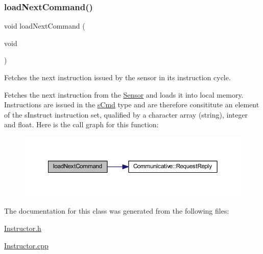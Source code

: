 \subsubsection{\texorpdfstring{loadNextCommand()}{loadNextCommand()}}
{\footnotesize\ttfamily void load\+Next\+Command (\begin{DoxyParamCaption}\item[{void}]{ }\end{DoxyParamCaption})}



Fetches the next instruction issued by the sensor in its instruction cycle. 

Fetches the next instruction from the \mbox{\hyperlink{class_sensor}{Sensor}} and loads it into local memory. Instructions are issued in the \mbox{\hyperlink{structs_cmd}{s\+Cmd}} type and are therefore consititute an element of the s\+Instruct instruction set, qualified by a character array (string), integer and float. Here is the call graph for this function\+:
\nopagebreak
\begin{figure}[H]
\begin{center}
\leavevmode
\includegraphics[width=350pt]{class_instructor_a43cbe18547a30108219f3aa2945fc9ca_cgraph}
\end{center}
\end{figure}


The documentation for this class was generated from the following files\+:\begin{DoxyCompactItemize}
\item 
\mbox{\hyperlink{_instructor_8h}{Instructor.\+h}}\item 
\mbox{\hyperlink{_instructor_8cpp}{Instructor.\+cpp}}\end{DoxyCompactItemize}
